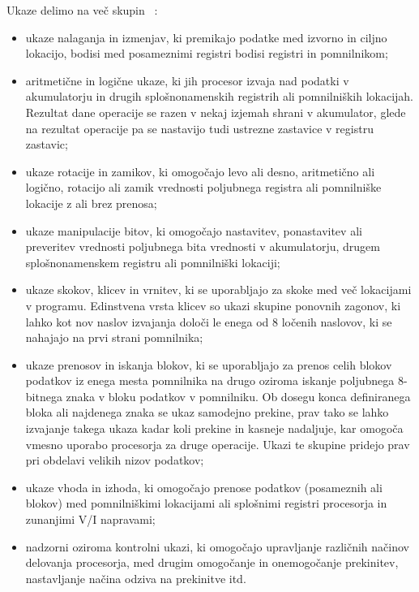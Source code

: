 \documentclass[a4paper, 12pt, openright]{book}
\begin{document}
    Ukaze delimo na več skupin ~\cite{z80cpuusermanual}:
    \begin{itemize}
        \item ukaze nalaganja in izmenjav, ki premikajo podatke med izvorno in
            ciljno lokacijo, bodisi med posameznimi registri bodisi registri in pomnilnikom;

        \item aritmetične in logične ukaze, ki jih procesor izvaja nad podatki v
            akumulatorju in drugih splošnonamenskih registrih ali pomnilniških
            lokacijah. Rezultat dane operacije se razen v nekaj izjemah shrani v akumulator,
            glede na rezultat operacije pa se nastavijo tudi ustrezne zastavice
            v registru zastavic;

        \item ukaze rotacije in zamikov, ki omogočajo levo ali desno, aritmetično
            ali logično, rotacijo ali zamik vrednosti poljubnega registra ali
            pomnilniške lokacije z ali brez prenosa;

        \item ukaze manipulacije bitov, ki omogočajo nastavitev, ponastavitev ali
            preveritev vrednosti poljubnega bita vrednosti v akumulatorju,
            drugem splošnonamenskem registru ali pomnilniški lokaciji;

        \item ukaze skokov, klicev in vrnitev, ki se uporabljajo za skoke med več
            lokacijami v programu. Edinstvena vrsta klicev so ukazi skupine
            ponovnih zagonov, ki lahko kot nov naslov izvajanja določi le enega od
            8 ločenih naslovov, ki se nahajajo na prvi strani pomnilnika;

        \item ukaze prenosov in iskanja blokov, ki se uporabljajo za prenos
            celih blokov podatkov iz enega mesta pomnilnika na drugo oziroma
            iskanje poljubnega 8-bitnega znaka v bloku podatkov v pomnilniku. Ob dosegu
            konca definiranega bloka ali najdenega znaka se ukaz samodejno prekine,
            prav tako se lahko izvajanje takega ukaza kadar koli prekine in
            kasneje nadaljuje, kar omogoča vmesno uporabo procesorja za druge operacije.
            Ukazi te skupine pridejo prav pri obdelavi velikih nizov podatkov;

        \item ukaze vhoda in izhoda, ki omogočajo prenose podatkov (posameznih ali
            blokov) med pomnilniškimi lokacijami ali splošnimi registri
            procesorja in zunanjimi V/I napravami;

        \item nadzorni oziroma kontrolni ukazi, ki omogočajo upravljanje
            različnih načinov delovanja procesorja, med drugim omogočanje in onemogočanje
            prekinitev, nastavljanje načina odziva na prekinitve itd.
    \end{itemize}
\end{document}
